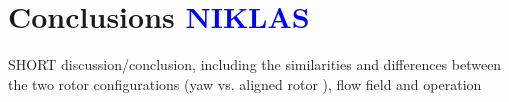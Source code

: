 \chapter{Conclusions \textcolor{blue}{NIKLAS}}

SHORT discussion/conclusion, including the similarities and differences between the two rotor configurations (yaw vs. aligned rotor ), flow field and operation